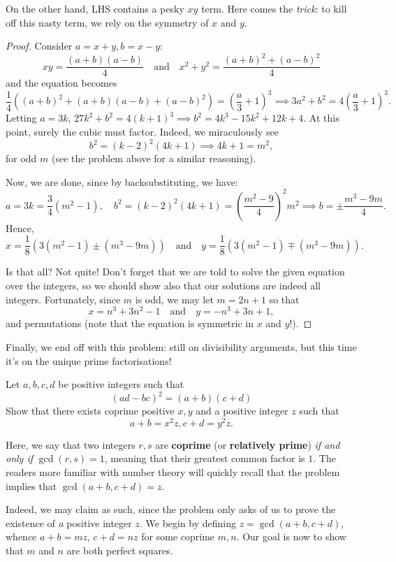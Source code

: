 \documentclass[../main.tex]{subfiles}
\begin{document}
On the other hand, LHS contains a pesky $xy$ term. Here comes the \textit{trick}: to kill off this nasty term, we rely on the symmetry of $x$ and $y$. 
\begin{proof}
    Consider $a=x+y, b=x-y$:
    $$xy= \frac{(a+b)(a-b)}{4} \quad\text{and}\quad x^2+y^2= \frac{(a+b)^2+(a-b)^2}{4}$$
and the equation becomes
$$\frac{1}{4}\left((a+b)^2+(a+b)(a-b)+(a-b)^2\right)=\left(\frac{a}{3}+1\right)^3 \implies 3a^2+b^2=4\left(\frac{a}{3}+1\right)^3.$$
Letting $a=3k$, $27k^2+b^2=4(k+1)^3 \implies b^2=4k^3-15k^2+12k+4$.
At this point, surely the cubic must factor. Indeed, we miraculously see
$$b^2=(k-2)^2(4k+1) \implies 4k+1=m^2,$$
for odd $m$ (see the problem above for a similar reasoning).

Now, we are done, since by backsubstituting, we have:
$$a=3k=\frac{3}{4}(m^2-1), \quad b^2=(k-2)^2(4k+1)=\left(\frac{m^2-9}{4}\right)^2m^2 \implies b=\pm \frac{m^3-9m}{4}.$$
Hence,
$$x=\frac{1}{8}\left(3(m^2-1)\pm(m^3-9m)\right)\quad\text{and}\quad y=\frac{1}{8}\left(3(m^2-1)\mp(m^3-9m)\right).$$

Is that all? Not quite! Don't forget that we are told to solve the given equation over the integers, so we should show also that our solutions are indeed all integers. Fortunately, since $m$ is odd, we may let $m=2n+1$ so that
$$\boxed{x=n^3+3n^2-1\quad\text{and}\quad y=-n^3+3n+1},$$
and permutations (note that the equation is symmetric in $x$ and $y$!).
\end{proof}

Finally, we end off with this problem: still on divisibility arguments, but this time it's on the unique prime factorisations!
\begin{example}[2021 H3 Math P1 Q4]
Let $a,b,c,d$ be positive integers such that
\begin{equation}\label{5.3-det}
    (ad-bc)^2=(a+b)(c+d)
\end{equation}
Show that there exists coprime positive $x,y$ and a positive integer $z$ such that
$$a+b=x^2z, c+d=y^2z.$$
\end{example}
Here, we say that two integers $r,s$ are \textbf{coprime} (or \textbf{relatively prime}) \textit{if and only if} $\gcd(r,s)=1$, meaning that their greatest common factor is $1$. The readers more familiar with number theory will quickly recall that the problem implies that $\gcd(a+b, c+d)=z$.

Indeed, we may claim as such, since the problem only asks of us to prove the existence of \textit{a} positive integer $z$. We begin by defining $z=\gcd(a+b, c+d)$, whence $a+b=mz$, $c+d=nz$ for some coprime $m, n$. Our goal is now to show that $m$ and $n$ are both perfect squares.
\end{document}
